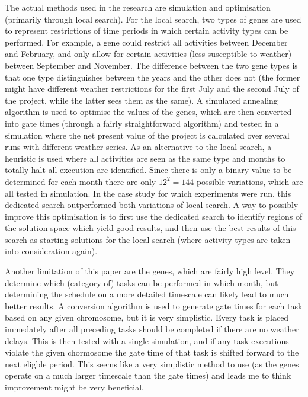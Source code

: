 \documentclass[a4paper,12pt]{article}
\begin{document}
The actual methods used in the research are simulation and optimisation (primarily through local search). For the local search, two types of genes are used to represent restrictions of time periods in which certain activity types can be performed. For example, a gene could restrict all activities between December and February, and only allow for certain activities (less susceptible to weather) between September and November. The difference between the two gene types is that one type distinguishes between the years and the other does not (the former might have different weather restrictions for the first July and the second July of the project, while the latter sees them as the same). A simulated annealing algorithm is used to optimise the values of the genes, which are then converted into gate times (through a fairly straightforward algorithm) and tested in a simulation where the net present value of the project is calculated over several runs with different weather series. As an alternative to the local search, a heuristic is used where all activities are seen as the same type and months to totally halt all execution are identified. Since there is only a binary value to be determined for each month there are only $12^2 = 144$ possible variations, which are all tested in simulation. In the case study for which experiments were run, this dedicated search outperformed both variations of local search. A way to possibly improve this optimisation is to first use the dedicated search to identify regions of the solution space which yield good results, and then use the best results of this search as starting solutions for the local search (where activity types are taken into consideration again). 

Another limitation of this paper are the genes, which are fairly high level. They determine which (category of) tasks can be performed in which month, but determining the schedule on a more detailed timescale can likely lead to much better results. A conversion algorithm is used to generate gate times for each task based on any given chromosome, but it is very simplistic. Every task is placed immedately after all preceding tasks should be completed if there are no weather delays. This is then tested with a single simulation, and if any task executions violate the given chormosome the gate time of that task is shifted forward to the next eligble period. This seems like a very simplistic method to use (as the genes operate on a much larger timescale than the gate times) and leads me to think improvement might be very beneficial.
\end{document}
